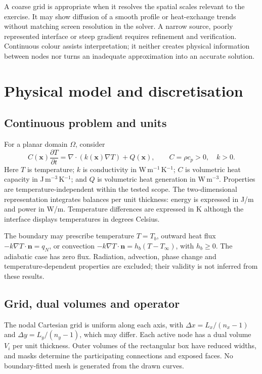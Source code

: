 \documentclass[11pt,a4paper]{article}
\begin{document}
A coarse grid is appropriate when it resolves the spatial scales relevant to the exercise. It may show diffusion of a smooth profile or heat-exchange trends without matching screen resolution in the solver. A narrow source, poorly represented interface or steep gradient requires refinement and verification. Continuous colour assists interpretation; it neither creates physical information between nodes nor turns an inadequate approximation into an accurate solution.

\section{Physical model and discretisation}
\subsection{Continuous problem and units}
For a planar domain $\Omega$, consider
\begin{equation}
 C(\mathbf{x})\frac{\partial T}{\partial t}=\nabla\!\cdot(k(\mathbf{x})\nabla T)+Q(\mathbf{x}),\qquad C=\rho c_p>0,\quad k>0.
 \label{eq:pde}
\end{equation}
Here $T$ is temperature; $k$ is conductivity in W\,m$^{-1}$\,K$^{-1}$; $C$ is volumetric heat capacity in J\,m$^{-3}$\,K$^{-1}$; and $Q$ is volumetric heat generation in W\,m$^{-3}$. Properties are temperature-independent within the tested scope. The two-dimensional representation integrates balances per unit thickness: energy is expressed in J/m and power in W/m. Temperature differences are expressed in K although the interface displays temperatures in degrees Celsius.

The boundary may prescribe temperature $T=T_b$, outward heat flux $-k\nabla T\cdot\mathbf n=q_N$, or convection $-k\nabla T\cdot\mathbf n=h_b(T-T_\infty)$, with $h_b\geq0$. The adiabatic case has zero flux. Radiation, advection, phase change and temperature-dependent properties are excluded; their validity is not inferred from these results.

\subsection{Grid, dual volumes and operator}
The nodal Cartesian grid is uniform along each axis, with $\Delta x=L_x/(n_x-1)$ and $\Delta y=L_y/(n_y-1)$, which may differ. Each active node has a dual volume $V_i$ per unit thickness. Outer volumes of the rectangular box have reduced widths, and masks determine the participating connections and exposed faces. No boundary-fitted mesh is generated from the drawn curves.
\end{document}
